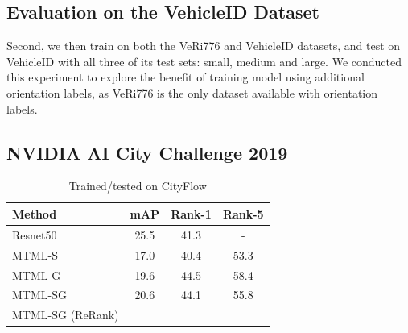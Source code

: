 \documentclass[10pt,twocolumn,letterpaper]{article}
\begin{document}
\subsection{Evaluation on the VehicleID Dataset}
Second, we then train on both the VeRi776 and VehicleID datasets, and
test on VehicleID with all three of its test sets: small, medium and
large. We conducted this experiment to explore the benefit of training
model using additional orientation labels, as VeRi776 is the only
dataset available with orientation labels.



\subsection{NVIDIA AI City Challenge 2019}

\begin{table}[h]
  \centering
  \begin{tabular}{l || c | c | c }
    \hline
    Method & mAP & Rank-1 & Rank-5 \\
    \hline
    Resnet50\cite{tang2019cityflow} & 25.5 & 41.3 & - \\
    \hline
    MTML-S  & 17.0 & 40.4 & 53.3 \\
    MTML-G  & 19.6 & 44.5 & 58.4 \\
    \hdashline
    MTML-SG & 20.6 & 44.1 & 55.8 \\
    \hdashline
    MTML-SG (ReRank) &  & & \\
    \hline
  \end{tabular}
  \caption{Trained/tested on CityFlow}
  \label{T:cityflow_results}
\end{table}
\end{document}
